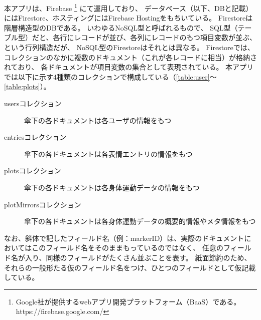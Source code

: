 本アプリは、Firebase
\footnote{Google社が提供するwebアプリ開発プラットフォーム（BaaS）である。https://firebase.google.com/}
にて運用しており、
データベース（以下、DBと記載）にはFirestore、ホスティングにはFirebase Hostingをもちいている。
Firestoreは階層構造型のDBである。
いわゆるNoSQL型と呼ばれるもので、
SQL型（テーブル型）だと、各行にレコードが並び、各列にレコードのもつ項目変数が並ぶ、という行列構造だが、
NoSQL型のFirestoreはそれとは異なる。
Firestoreでは、コレクションのなかに複数のドキュメント（これが各レコードに相当）が格納されており、
各ドキュメントが項目変数の集合として表現されている。
本アプリでは以下に示す4種類のコレクションで構成している（\autoref{table:user}〜\autoref{table:plots}）。
\begin{description}
  \item[usersコレクション]\mbox{傘下の各ドキュメントは各ユーザの情報をもつ}  
  \item[entriesコレクション]\mbox{傘下の各ドキュメントは各表情エントリの情報をもつ}
  \item[plotsコレクション]\mbox{傘下の各ドキュメントは各身体運動データの情報をもつ}  
  \item [plotMirrorsコレクション]\mbox{傘下の各ドキュメントは各身体運動データの概要的情報やメタ情報をもつ}      
\end{description}
なお、斜体で記したフィールド名（例：markerID）は、実際のドキュメントにおいてはこのフィールド名をそのままもっているのではなく、
任意のフィールド名が入り、同様のフィールドがたくさん並ぶことを表す。
紙面節約のため、それらの一般形たる仮のフィールド名をつけ、ひとつのフィールドとして仮記載している。

